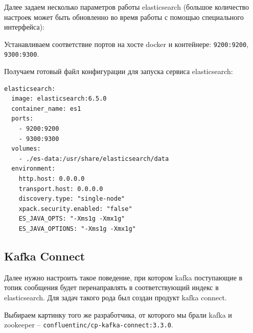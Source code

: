 Далее задаем несколько параметров работы elasticsearch (большое количество
настроек может быть обновленно во время работы с помощью специального
интерфейса):

Устанавливаем соответствие портов на хосте docker и контейнере:
\verb|9200:9200|, \verb|9300:9300|.

Получаем готовый файл конфигурации для запуска сервиса elasticsearch:
\begin{verbatim}
elasticsearch:
  image: elasticsearch:6.5.0
  container_name: es1
  ports:
    - 9200:9200
    - 9300:9300
  volumes:
    - ./es-data:/usr/share/elasticsearch/data
  environment:
    http.host: 0.0.0.0
    transport.host: 0.0.0.0
    discovery.type: "single-node"
    xpack.security.enabled: "false"
    ES_JAVA_OPTS: "-Xms1g -Xmx1g"
    ES_JAVA_OPTIONS: "-Xms1g -Xmx1g"
\end{verbatim}


\subsection{Kafka Connect}
Далее нужно настроить такое поведение, при котором kafka поступающие в топик
сообщения будет перенаправлять в соответствующий индекс в elasticsearch. Для
задач такого рода был создан продукт kafka connect.

Выбираем картинку того же разработчика, от которого мы брали kafka и zookeeper
-- \verb|confluentinc/cp-kafka-connect:3.3.0|.

